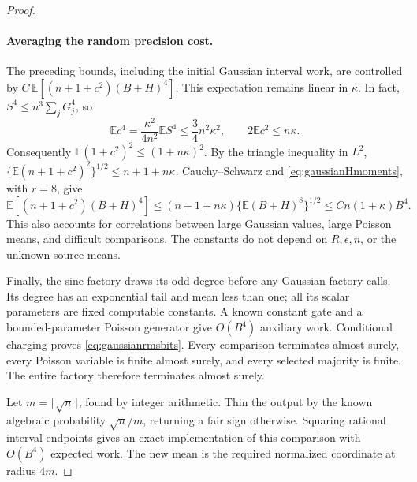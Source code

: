 \begin{proof}
\paragraph{Averaging the random precision cost.}
The preceding bounds, including the initial Gaussian interval work,
are controlled by
$C\,\mathbb E[(n+1+c^2)(B+H)^4]$. This expectation remains linear in
$\kappa$. In fact, $S^4\le n^3\sum_jG_j^4$, so
\[
 \mathbb E c^4
 =\frac{\kappa^2}{4n^2}\mathbb E S^4
 \le\frac34n^2\kappa^2,
 \qquad
 2\mathbb E c^2\le n\kappa.
\]
Consequently
$\mathbb E(1+c^2)^2\le(1+n\kappa)^2$. By the triangle inequality in
$L^2$, $\{\mathbb E(n+1+c^2)^2\}^{1/2}\le n+1+n\kappa$.
Cauchy--Schwarz and \eqref{eq:gaussianHmoments}, with $r=8$, give
\[
 \mathbb E[(n+1+c^2)(B+H)^4]
 \le(n+1+n\kappa)
       \{\mathbb E(B+H)^8\}^{1/2}
 \le Cn(1+\kappa)B^4.
\]
This also accounts for correlations between large Gaussian values,
large Poisson means, and difficult comparisons. The constants do not
depend on $R,\epsilon,n$, or the unknown source means.

Finally, the sine factory draws its odd degree before any Gaussian
factory calls. Its degree has an exponential tail and mean less than
one; all its scalar parameters are fixed computable constants. A
known constant gate and a bounded-parameter Poisson generator give
$O(B^4)$ auxiliary work. Conditional charging proves
\eqref{eq:gaussianrmsbits}. Every comparison terminates almost surely,
every Poisson variable is finite almost surely, and every selected
majority is finite. The entire factory therefore terminates almost
surely.

Let $m=\lceil\sqrt n\rceil$, found by integer arithmetic. Thin the
output by the known algebraic probability $\sqrt n/m$, returning a
fair sign otherwise. Squaring rational interval endpoints gives an
exact implementation of this comparison with $O(B^4)$ expected work.
The new mean is the required normalized coordinate at radius $4m$.
\end{proof}
